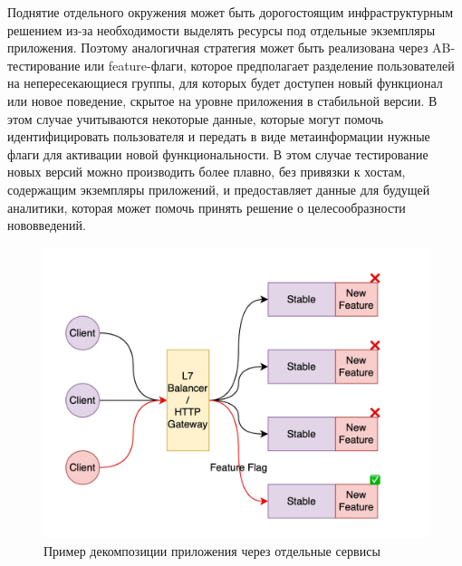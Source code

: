 Поднятие отдельного окружения может быть дорогостоящим инфраструктурным решением из-за необходимости
выделять ресурсы под отдельные экземпляры приложения. Поэтому аналогичная стратегия может быть
реализована через AB-тестирование или feature-флаги, которое предполагает разделение
пользователей на непересекающиеся группы, для которых будет доступен новый функционал или новое поведение,
скрытое на уровне приложения в стабильной версии. В этом случае учитываются некоторые данные,
которые могут помочь идентифицировать пользователя и передать в виде метаинформации нужные флаги
для активации новой функциональности. В этом случае тестирование новых версий можно производить более плавно, без
привязки к хостам, содержащим экземпляры приложений, и предоставляет данные для будущей
аналитики, которая может помочь принять решение о целесообразности нововведений.

\begin{figure}[H]
    \centering
    \includegraphics[width=0.8\linewidth]{img/ab.jpg}
    \caption{Пример декомпозиции приложения через отдельные сервисы}
    \label{fig:y}
\end{figure}

